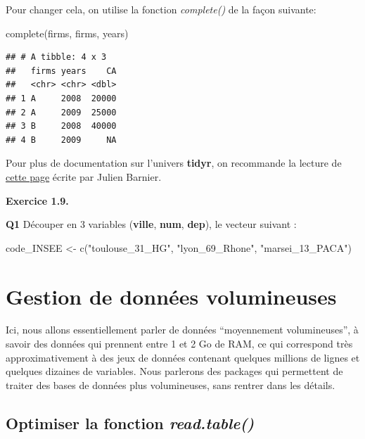 \documentclass[
]{book}
\newenvironment{Shaded}{\begin{snugshade}}{\end{snugshade}}
\newcommand{\FunctionTok}[1]{\textcolor[rgb]{0.00,0.00,0.00}{#1}}
\newcommand{\NormalTok}[1]{#1}
\newcommand{\OtherTok}[1]{\textcolor[rgb]{0.56,0.35,0.01}{#1}}
\newcommand{\StringTok}[1]{\textcolor[rgb]{0.31,0.60,0.02}{#1}}
\theoremstyle{definition}
\theoremstyle{definition}
\theoremstyle{definition}
\theoremstyle{definition}
\theoremstyle{remark}
\begin{document}
Pour changer cela, on utilise la fonction \emph{complete()} de la façon suivante:

\begin{Shaded}
\begin{Highlighting}[]
\FunctionTok{complete}\NormalTok{(firms, firms, years)}
\end{Highlighting}
\end{Shaded}

\begin{verbatim}
## # A tibble: 4 x 3
##   firms years    CA
##   <chr> <chr> <dbl>
## 1 A     2008  20000
## 2 A     2009  25000
## 3 B     2008  40000
## 4 B     2009     NA
\end{verbatim}

Pour plus de documentation sur l'univers \textbf{tidyr}, on recommande la lecture de \href{https://juba.github.io/tidyverse/12-tidyr.html\#fn19}{cette page} écrite par Julien Barnier.

\textbf{Exercice 1.9.}

\textbf{Q1} Découper en 3 variables (\textbf{ville}, \textbf{num}, \textbf{dep}), le vecteur suivant :

\begin{Shaded}
\begin{Highlighting}[]
\NormalTok{code\_INSEE }\OtherTok{\textless{}{-}} \FunctionTok{c}\NormalTok{(}\StringTok{"toulouse\_31\_HG"}\NormalTok{, }\StringTok{"lyon\_69\_Rhone"}\NormalTok{, }\StringTok{"marsei\_13\_PACA"}\NormalTok{)}
\end{Highlighting}
\end{Shaded}

\hypertarget{gestion-de-donnuxe9es-volumineuses}{%
\section{Gestion de données volumineuses}\label{gestion-de-donnuxe9es-volumineuses}}

Ici, nous allons essentiellement parler de données ``moyennement volumineuses'', à savoir des données qui prennent entre 1 et 2 Go de RAM, ce qui correspond très approximativement à des jeux de données contenant quelques millions de lignes et quelques dizaines de variables. Nous parlerons des packages qui permettent de traiter des bases de données plus volumineuses, sans rentrer dans les détails.

\hypertarget{optimiser-la-fonction-read.table}{%
\subsection{\texorpdfstring{Optimiser la fonction \emph{read.table()}}{Optimiser la fonction read.table()}}\label{optimiser-la-fonction-read.table}}
\end{document}
